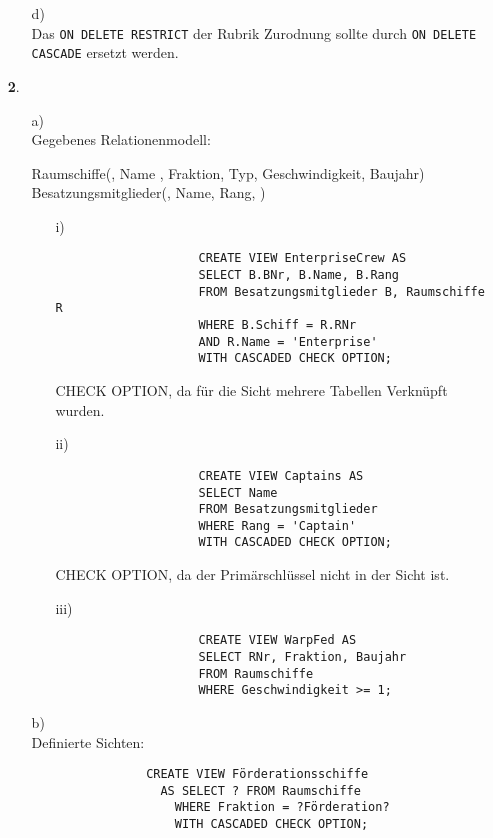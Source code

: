 \documentclass[a4paper,11pt,fleqn]{scrartcl}
\begin{document}
\begin{enumerate}
\begin{enumerate}
			\item[d)] \quad \\
			Das \texttt{ON DELETE RESTRICT} der Rubrik Zurodnung sollte durch \texttt{ON DELETE CASCADE} 
			ersetzt werden. \\
		\end{enumerate}
	
		\newpage
		\item[\textbf{2}.]
		\begin{enumerate}
			\item[a)] \quad \\
			Gegebenes Relationenmodell: \\
			\begin{RMSchma}
				Raumschiffe(, Name , Fraktion, Typ, Geschwindigkeit, Baujahr)\\
				Besatzungsmitglieder(, Name, Rang, )
			\end{RMSchma}
			
			\begin{enumerate}
				\item[i)]
				\begin{verbatim}
					CREATE VIEW EnterpriseCrew AS
					SELECT B.BNr, B.Name, B.Rang
					FROM Besatzungsmitglieder B, Raumschiffe R
					WHERE B.Schiff = R.RNr
					AND R.Name = 'Enterprise'
					WITH CASCADED CHECK OPTION;
				\end{verbatim}
				CHECK OPTION, da für die Sicht mehrere Tabellen Verknüpft wurden.

				\item[ii)]
				\begin{verbatim}
					CREATE VIEW Captains AS
					SELECT Name
					FROM Besatzungsmitglieder
					WHERE Rang = 'Captain'
					WITH CASCADED CHECK OPTION;
				\end{verbatim}
				CHECK OPTION, da der Primärschlüssel nicht in der Sicht ist.

				\item[iii)]
				\begin{verbatim}
					CREATE VIEW WarpFed AS
					SELECT RNr, Fraktion, Baujahr
					FROM Raumschiffe
					WHERE Geschwindigkeit >= 1;
				\end{verbatim}
			\end{enumerate}
		

			\item[b)] \quad \\
			Definierte Sichten:
			\begin{verbatim}
				CREATE VIEW Förderationsschiffe
				  AS SELECT ? FROM Raumschiffe
					WHERE Fraktion = ?Förderation?
					WITH CASCADED CHECK OPTION;


\end{verbatim}
\end{enumerate}
\end{enumerate}
\end{document}
